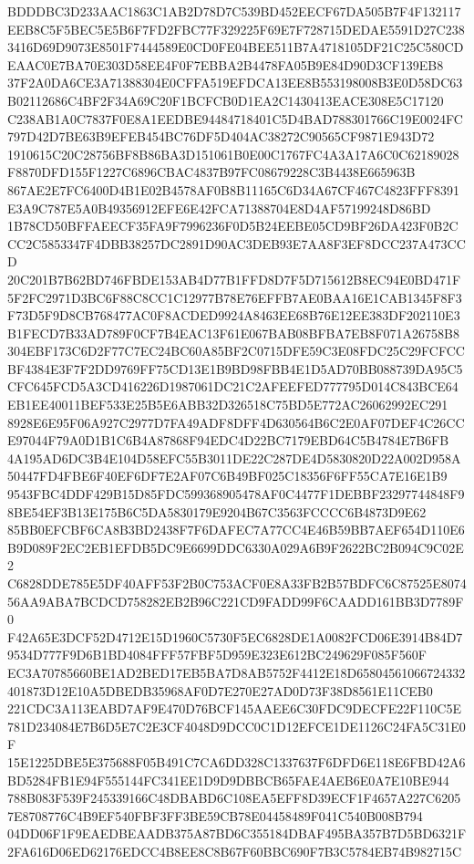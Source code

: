 \documentclass[UTF8,fontset=fandol,zihao=-4,a4paper]{ctexart}
\begin{document}
{{BDDDBC3D233AAC1863C1AB2D78D7C539BD452EECF67DA505B7F4F132117EEB8C5F5BEC5E5B6F7FD2FBC77F329225F69E7F728715DEDAE5591D27C238
3416D69D9073E8501F7444589E0CD0FE04BEE511B7A4718105DF21C25C580CDEAAC0E7BA70E303D58EE4F0F7EBBA2B4478FA05B9E84D90D3CF139EB8
37F2A0DA6CE3A71388304E0CFFA519EFDCA13EE8B553198008B3E0D58DC63B02112686C4BF2F34A69C20F1BCFCB0D1EA2C1430413EACE308E5C17120
C238AB1A0C7837F0E8A1EEDBE94484718401C5D4BAD788301766C19E0024FC797D42D7BE63B9EFEB454BC76DF5D404AC38272C90565CF9871E943D72
1910615C20C28756BF8B86BA3D151061B0E00C1767FC4A3A17A6C0C62189028F8870DFD155F1227C6896CBAC4837B97FC08679228C3B4438E665963B
867AE2E7FC6400D4B1E02B4578AF0B8B11165C6D34A67CF467C4823FFF8391E3A9C787E5A0B49356912EFE6E42FCA71388704E8D4AF57199248D86BD
1B78CD50BFFAEECF35FA9F7996236F0D5B24EEBE05CD9BF26DA423F0B2CCC2C5853347F4DBB38257DC2891D90AC3DEB93E7AA8F3EF8DCC237A473CCD
20C201B7B62BD746FBDE153AB4D77B1FFD8D7F5D715612B8EC94E0BD471F5F2FC2971D3BC6F88C8CC1C12977B78E76EFFB7AE0BAA16E1CAB1345F8F3
F73D5F9D8CB768477AC0F8ACDED9924A8463EE68B76E12EE383DF202110E3B1FECD7B33AD789F0CF7B4EAC13F61E067BAB08BFBA7EB8F071A26758B8
304EBF173C6D2F77C7EC24BC60A85BF2C0715DFE59C3E08FDC25C29FCFCCBF4384E3F7F2DD9769FF75CD13E1B9BD98FBB4E1D5AD70BB088739DA95C5
CFC645FCD5A3CD416226D1987061DC21C2AFEEFED777795D014C843BCE64EB1EE40011BEF533E25B5E6ABB32D326518C75BD5E772AC26062992EC291
8928E6E95F06A927C2977D7FA49ADF8DFF4D630564B6C2E0AF07DEF4C26CCE97044F79A0D1B1C6B4A87868F94EDC4D22BC7179EBD64C5B4784E7B6FB
4A195AD6DC3B4E104D58EFC55B3011DE22C287DE4D5830820D22A002D958A50447FD4FBE6F40EF6DF7E2AF07C6B49BF025C18356F6FF55CA7E16E1B9
9543FBC4DDF429B15D85FDC599368905478AF0C4477F1DEBBF23297744848F98BE54EF3B13E175B6C5DA5830179E9204B67C3563FCCCC6B4873D9E62
85BB0EFCBF6CA8B3BD2438F7F6DAFEC7A77CC4E46B59BB7AEF654D110E6B9D089F2EC2EB1EFDB5DC9E6699DDC6330A029A6B9F2622BC2B094C9C02E2
C6828DDE785E5DF40AFF53F2B0C753ACF0E8A33FB2B57BDFC6C87525E807456AA9ABA7BCDCD758282EB2B96C221CD9FADD99F6CAADD161BB3D7789F0
F42A65E3DCF52D4712E15D1960C5730F5EC6828DE1A0082FCD06E3914B84D79534D777F9D6B1BD4084FFF57FBF5D959E323E612BC249629F085F560F
EC3A70785660BE1AD2BED17EB5BA7D8AB5752F4412E18D65804561066724332401873D12E10A5DBEDB35968AF0D7E270E27AD0D73F38D8561E11CEB0
221CDC3A113EABD7AF9E470D76BCF145AAEE6C30FDC9DECFE22F110C5E781D234084E7B6D5E7C2E3CF4048D9DCC0C1D12EFCE1DE1126C24FA5C31E0F
15E1225DBE5E375688F05B491C7CA6DD328C1337637F6DFD6E118E6FBD42A6BD5284FB1E94F555144FC341EE1D9D9DBBCB65FAE4AEB6E0A7E10BE944
788B083F539F245339166C48DBABD6C108EA5EFF8D39ECF1F4657A227C62057E8708776C4B9EF540FBF3FF3BE59CB78E04458489F041C540B008B794
04DD06F1F9EAEDBEAADB375A87BD6C355184DBAF495BA357B7D5BD6321F2FA616D06ED62176EDCC4B8EE8C8B67F60BBC690F7B3C5784EB74B982715C
}}
\end{document}
